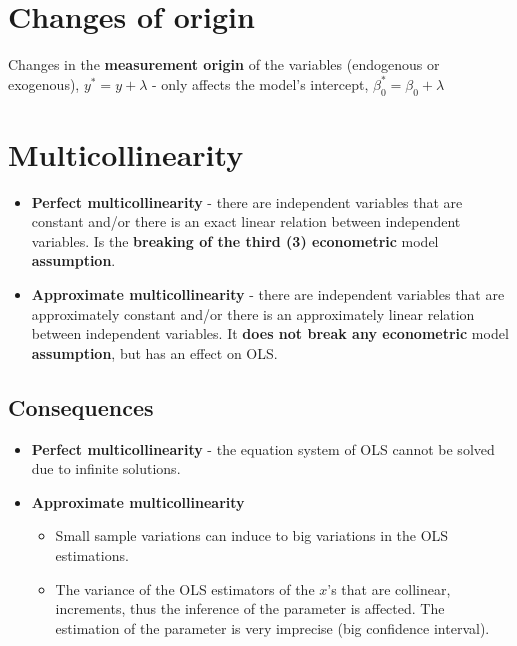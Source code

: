 \documentclass[10pt, a4paper, landscape]{extarticle}
\begin{document}
\begin{multicols}{3}
\section*{Changes of origin}

Changes in the \textbf{measurement origin} of the variables (endogenous or exogenous), $y^* = y + \lambda$ - only affects the model's intercept, $\beta_0^* = \beta_0 + \lambda$

\columnbreak

\section*{Multicollinearity}

\begin{itemize}[leftmargin=*]
	\item \textbf{Perfect multicollinearity} - there are independent variables that are constant and/or there is an exact linear relation between independent variables. Is the \textbf{breaking of the third (3) econometric} model \textbf{assumption}.
	\item \textbf{Approximate multicollinearity} - there are independent variables that are approximately constant and/or there is an approximately linear relation between independent variables. It \textbf{does not break any econometric} model \textbf{assumption}, but has an effect on OLS.
\end{itemize}

\subsection*{Consequences}

\begin{itemize}[leftmargin=*]
	\item \textbf{Perfect multicollinearity} - the equation system of OLS cannot be solved due to infinite solutions.
	\item \textbf{Approximate multicollinearity}
	\begin{itemize}[leftmargin=*]
		\item Small sample variations can induce to big variations in the OLS estimations.
		\item The variance of the OLS estimators of the $x$'s that are collinear, increments, thus the inference of the parameter is affected. The estimation of the parameter is very imprecise (big confidence interval).
	\end{itemize}
\end{itemize}


\end{multicols}
\end{document}
